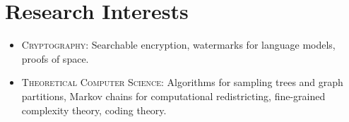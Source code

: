 
\section*{Research Interests}
\begin{itemize}

\item \textsc{Cryptography}: Searchable encryption, watermarks for language models, proofs of space.

\item \textsc{Theoretical Computer Science}: Algorithms for sampling trees and graph partitions, Markov chains for computational redistricting, fine-grained complexity theory, coding theory.

\end{itemize}
